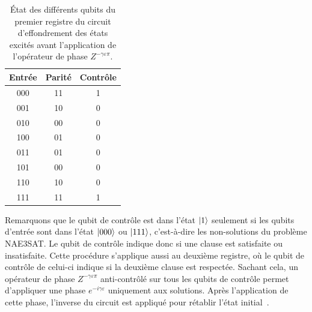 \begin{table}[ht!]
    \centering
    \begin{tabular}{c c c}
        \hline
        Entrée & Parité & Contrôle \\
        \hline
        000 & 11 & 1 \\
        001 & 10 & 0 \\
        010 & 00 & 0 \\
        100 & 01 & 0 \\
        011 & 01 & 0 \\
        101 & 00 & 0 \\
        110 & 10 & 0 \\
        111 & 11 & 1 \\
        \hline
    \end{tabular}
    \caption{État des différents qubits du premier registre du circuit d'effondrement des états excités avant l'application de l'opérateur de phase $Z^{-\gamma \varepsilon \pi}$.}
    \label{tab:tower-excited-states-parity}
\end{table}

Remarquons que le qubit de contrôle est dans l'état $\ket{1}$ seulement si les qubits d'entrée sont dans l'état $\ket{000}$ ou $\ket{111}$, c'est-à-dire les non-solutions du problème NAE3SAT. Le qubit de contrôle indique donc si une clause est satisfaite ou insatisfaite. Cette procédure s'applique aussi au deuxième registre, où le qubit de contrôle de celui-ci indique si la deuxième clause est respectée. Sachant cela, un opérateur de phase $Z^{-\gamma \varepsilon \pi}$ anti-contrôlé sur tous les qubits de contrôle permet d'appliquer une phase $e^{-i \gamma \varepsilon}$ uniquement aux solutions. Après l'application de cette phase, l'inverse du circuit est appliqué pour rétablir l'état initial~\cite{nielsenQuantumComputationQuantum2011}.


